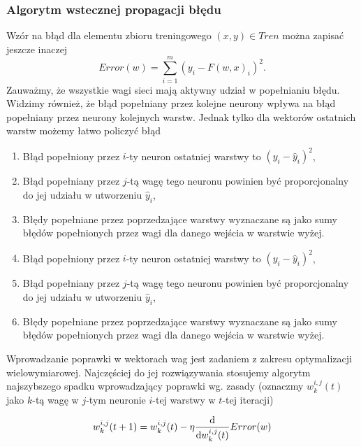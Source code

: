 \documentclass[10pt,a4paper]{book}
\begin{document}
\subsubsection{Algorytm wstecznej propagacji błędu}

Wzór na błąd dla elementu zbioru treningowego $(x,y) \in Tren$ można zapisać jeszcze inaczej
\begin{equation*}
Error(w) = \sum_{i =1 }^{m} (y_i - F(w,x)_i)^2.
\end{equation*}
Zauważmy, że wszystkie wagi sieci mają aktywny udział w popełnianiu błędu. Widzimy również, że błąd popełniany przez kolejne neurony wpływa na błąd popełniany przez neurony kolejnych warstw. Jednak tylko dla wektorów ostatnich warstw możemy łatwo policzyć błąd
\begin{enumerate}
\item Błąd popełniony przez $i$-ty neuron ostatniej warstwy to $(y_i - \hat{y}_i)^2$,
\item Błąd popełniany przez $j$-tą wagę tego neuronu powinien być proporcjonalny do jej udziału w utworzeniu $\hat{y}_i$,
\item Błędy popełniane przez poprzedzające warstwy wyznaczane są jako sumy błędów popełnionych przez wagi dla danego wejścia w warstwie wyżej.
\item Błąd popełniony przez $i$-ty neuron ostatniej warstwy to $(y_i - \hat{y}_i)^2$,
\item Błąd popełniany przez $j$-tą wagę tego neuronu powinien być proporcjonalny do jej udziału w utworzeniu $\hat{y}_i$,
\item Błędy popełniane przez poprzedzające warstwy wyznaczane są jako sumy błędów popełnionych przez wagi dla danego wejścia w warstwie wyżej.
\end{enumerate}

Wprowadzanie poprawki w wektorach wag jest zadaniem z zakresu optymalizacji wielowymiarowej. Najczęściej do jej rozwiązywania stosujemy algorytm najszybszego spadku wprowadzający poprawki wg. zasady (oznaczmy $w^{i,j}_k(t)$ jako $k$-tą wagę w $j$-tym neuronie $i$-tej warstwy w $t$-tej iteracji)

\begin{equation*}
w^{i,j}_k(t+1) = w^{i,j}_k (t) - \eta \frac{\mathrm{d} {} }{\mathrm{d}{w^{i,j}_k(t)}} Error(w)
\end{equation*}
\end{document}
